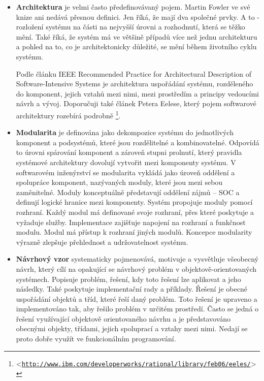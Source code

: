 \documentclass[11pt,twoside,a4paper]{book}
\let\oldUrl\url
\renewcommand\url[1]{<\texttt{\oldUrl{#1}}>}
\begin{document}
\begin{itemize}
\item \textbf{Architektura} je velmi často předefinovávaný pojem. Martin Fowler ve své knize \cite{PEAA} ani nedává přesnou definici. Jen říká, že mají dva společné prvky. A to - rozložení systému na části na nejvyšší úrovni a rozhodnutí, která se těžko mění. Také říká, že systém má ve většině případů více než jednu architekturu a pohled na to, co je architektonicky důležité, se mění během životního cyklu systému.

Podle článku IEEE Recommended Practice for Architectural Description of Software-Intensive Systems \cite{IEEE1471} je architektura uspořádání systému, rozděleného do komponent, jejich vztahů mezi nimi, mezi prostředím a principy vedoucími návrh a vývoj. Doporučuji také článek Petera Eelese, který pojem softwarové architektury rozebírá podrobně \footnote{\url{http://www.ibm.com/developerworks/rational/library/feb06/eeles/}}.


\item \textbf{Modularita} je definována jako dekompozice systému do jednotlivých komponent a podsystémů, které jsou rozdělitelné a kombinovatelné\cite{POSA}. Odpovídá to úrovni spárování komponent a zároveň stupni prolnutí, který pravidla systémové architektury dovolují vytvořit mezi komponenty systému. V softwarovém inženýrství se modularita vykládá jako úroveň oddělení a spolupráce komponent, nazývaných moduly, které jsou mezi sebou zaměnitelné. Moduly konceptuálně představují oddělení zájmů -- SOC a definují logické hranice mezi komponenty. Systém propojuje moduly pomocí rozhraní. Každý modul má definované svoje rozhraní, přes které poskytuje a vyžaduje služby. Implementace zajišťuje napojení na rozhraní a funkčnost modulu. Modul má přístup k rozhraní jiných modulů. Koncepce modularity výrazně zlepšuje přehlednost a udržovatelnost systému\cite{POSA}\cite{wiki:modular-programming}. 

\item \textbf{Návrhový vzor} systematicky pojmenovává, motivuje a vysvětluje všeobecný návrh, který cílí na opakující se návrhový problém v objektově-orientovaných systémech. Popisuje problém, řešení, kdy toto řešení lze aplikovat a jeho následky. Také poskytuje implementační rady a příklady. Řešení je obecné uspořádání objektů a tříd, které řeší daný problém. Toto řešení je upraveno a implementováno tak, aby řešilo problém v určitém prostředí\cite{GOF}. Často se jedná o řešení využívající objektově orientovaného návrhu a je představováno obecnými objekty, třídami, jejich spoluprací a vztahy mezi nimi. Nedají se proto dobře využít ve funkcionálním programování. \cite{wiki:design-pattern-computer-science}


\end{itemize}
\end{document}
